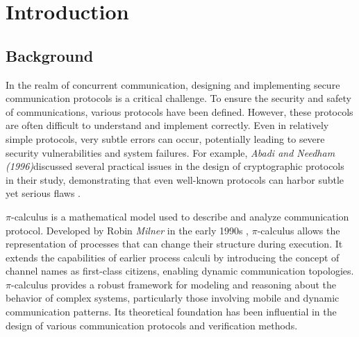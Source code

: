 \documentclass[master,english]{kuisthesis}
\theoremstyle{definition}
\begin{document}
\begin{eabstract}
\end{eabstract}



\tableofcontents				%

\section{Introduction}\label{sec-intro}		%

\subsection{Background}

In the realm of concurrent communication, designing and implementing secure communication protocols is a critical challenge. To ensure the security and safety of communications, various protocols have been defined. However, these protocols are often difficult to understand and implement correctly. Even in relatively simple protocols, very subtle errors can occur, potentially leading to severe security vulnerabilities and system failures. For example, \textit{Abadi and Needham (1996)}discussed several practical issues in the design of cryptographic protocols in their study, demonstrating that even well-known protocols can harbor subtle yet serious flaws \cite{?}.


$\pi$-calculus is a mathematical model used to describe and analyze communication protocol. Developed by Robin \textit{Milner} in the early 1990s \cite{?}, $\pi$-calculus allows the representation of processes that can change their structure during execution. It extends the capabilities of earlier process calculi by introducing the concept of channel names as first-class citizens, enabling dynamic communication topologies. $\pi$-calculus provides a robust framework for modeling and reasoning about the behavior of complex systems, particularly those involving mobile and dynamic communication patterns. Its theoretical foundation has been influential in the design of various communication protocols and verification methods.
\end{document}
